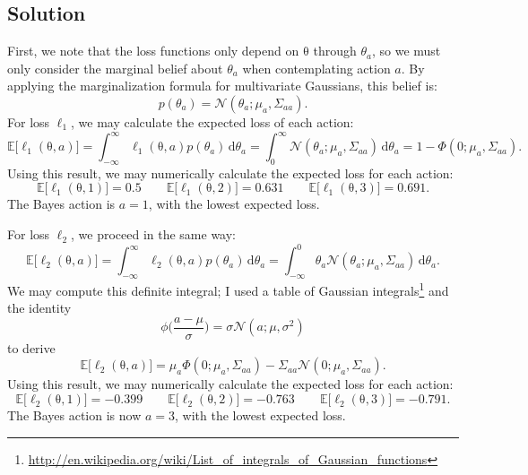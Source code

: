 \documentclass{article}
\newcommand{\mc}[1]{\mathcal{#1}}
\newcommand{\intd}[1]{\,\mathrm{d}{#1}}
\renewcommand{\vec}[1]{\bm{\mathrm{#1}}}
\begin{document}
\subsection*{Solution}

First, we note that the loss functions only depend on $\vec{\theta}$
through $\theta_a$, so we must only consider the marginal belief about
$\theta_a$ when contemplating action $a$.  By applying the marginalization
formula for multivariate Gaussians, this belief is:
\begin{equation*}
  p(\theta_a) = \mc{N}(\theta_a; \mu_a, \Sigma_{aa}).
\end{equation*}
For loss $\ell_1$, we may calculate the expected loss of each action:
\begin{equation*}
  \mathbb{E}
  \bigl[
    \ell_1(\vec{\theta}, a)
  \bigr]
  =
  \int_{-\infty}^\infty
  \ell_1(\vec{\theta}, a)
  p(\theta_a)
  \intd{\theta_a}
  =
  \int_0^\infty
  \mc{N}(\theta_a; \mu_a, \Sigma_{aa})
  \intd{\theta_a}
  =
  1 - \Phi(0; \mu_a, \Sigma_{aa}).
\end{equation*}
Using this result, we may numerically calculate the expected loss for
each action:
\begin{equation*}
  \mathbb{E}\bigl[\ell_1(\vec{\theta}, 1)\bigr]
  =
  0.5 \qquad
  \mathbb{E}\bigl[\ell_1(\vec{\theta}, 2)\bigr]
  =
  0.631 \qquad
  \mathbb{E}\bigl[\ell_1(\vec{\theta}, 3)\bigr]
  =
  0.691.
\end{equation*}
The Bayes action is $a = 1$, with the lowest expected loss.

For loss $\ell_2$, we proceed in the same way:
\begin{equation*}
  \mathbb{E}
  \bigl[
    \ell_2(\vec{\theta}, a)
  \bigr]
  =
  \int_{-\infty}^\infty
  \ell_2(\vec{\theta}, a)
  p(\theta_a)
  \intd{\theta_a}
  =
  \int_{-\infty}^0
  \theta_a
  \mc{N}(\theta_a; \mu_a, \Sigma_{aa})
  \intd{\theta_a}.
\end{equation*}
We may compute this definite integral; I used a table of Gaussian
integrals\footnote{\url{http://en.wikipedia.org/wiki/List_of_integrals_of_Gaussian_functions}}
and the identity
\begin{equation*}
  \phi\biggl(
  \frac{a - \mu}{\sigma}
  \biggr)
  =
  \sigma \mc{N}(a; \mu, \sigma^2)
\end{equation*}
to derive
\begin{equation*}
  \mathbb{E}
  \bigl[
    \ell_2(\vec{\theta}, a)
  \bigr]
  =
  \mu_a \Phi(0; \mu_a, \Sigma_{aa})
  -
  \Sigma_{aa}
  \mc{N}(0; \mu_a, \Sigma_{aa}).
\end{equation*}
Using this result, we may numerically calculate the expected loss for
each action:
\begin{equation*}
  \mathbb{E}\bigl[\ell_2(\vec{\theta}, 1)\bigr]
  =
  -0.399 \qquad
  \mathbb{E}\bigl[\ell_2(\vec{\theta}, 2)\bigr]
  =
  -0.763 \qquad
  \mathbb{E}\bigl[\ell_2(\vec{\theta}, 3)\bigr]
  =
  -0.791.
\end{equation*}
The Bayes action is now $a = 3$, with the lowest expected loss.
\end{document}
